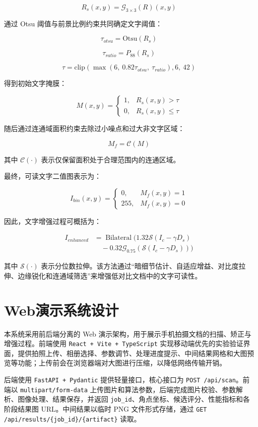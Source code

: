 \documentclass[letterpaper]{article}
\begin{document}
\[
R_s(x,y)=\mathcal{G}_{3\times3}(R)(x,y)
\]

通过 Otsu 阈值与前景比例约束共同确定文字阈值：

\[
\tau_{otsu}=\mathrm{Otsu}(R_s)
\]

\[
\tau_{ratio}=P_{88}(R_s)
\]

\[
\tau=
\mathrm{clip}
\left(
\max(6,\ 0.82\tau_{otsu},\ \tau_{ratio}),
6,\ 42
\right)
\]

得到初始文字掩膜：

\[
M(x,y)=
\begin{cases}
1, & R_s(x,y)>\tau \\
0, & R_s(x,y)\leq \tau
\end{cases}
\]

随后通过连通域面积约束去除过小噪点和过大非文字区域：

\[
M_f=\mathcal{C}(M)
\]

其中 \(\mathcal{C}(\cdot)\) 表示仅保留面积处于合理范围内的连通区域。

最终，可读文字二值图表示为：

\[
I_{bin}(x,y)=
\begin{cases}
0, & M_f(x,y)=1 \\
255, & M_f(x,y)=0
\end{cases}
\]

因此，文字增强过程可概括为：

\[
\begin{aligned}
I_{enhanced}
&=
\operatorname{Bilateral}\Big(
1.32\mathcal{S}(I_c-\gamma D_s) \\
&\quad -
0.32\mathcal{G}_{0.75}(\mathcal{S}(I_c-\gamma D_s))
\Big)
\end{aligned}
\]

其中 \(\mathcal{S}(\cdot)\) 表示分位数拉伸。该方法通过“暗细节估计、自适应增益、对比度拉伸、边缘锐化和连通域筛选”来增强低对比文档中的文字可读性。

\section{Web演示系统设计}

本系统采用前后端分离的 Web 演示架构，用于展示手机拍摄文档的扫描、矫正与增强过程。前端使用 \texttt{React + Vite + TypeScript} 实现移动端优先的实验验证界面，提供拍照上传、相册选择、参数调节、处理进度提示、中间结果网格和大图预览等功能；上传前会在浏览器端对大图进行压缩，以降低网络传输开销。

后端使用 \texttt{FastAPI + Pydantic} 提供轻量接口，核心接口为 \texttt{POST /api/scan}。前端以 \texttt{multipart/form-data} 上传图片和算法参数，后端完成图片校验、参数解析、图像处理、结果保存，并返回 \texttt{job\_id}、角点坐标、候选评分、性能指标和各阶段结果图 URL。中间结果以临时 PNG 文件形式存储，通过 \texttt{GET /api/results/\{job\_id\}/\{artifact\}} 读取。
\end{document}
